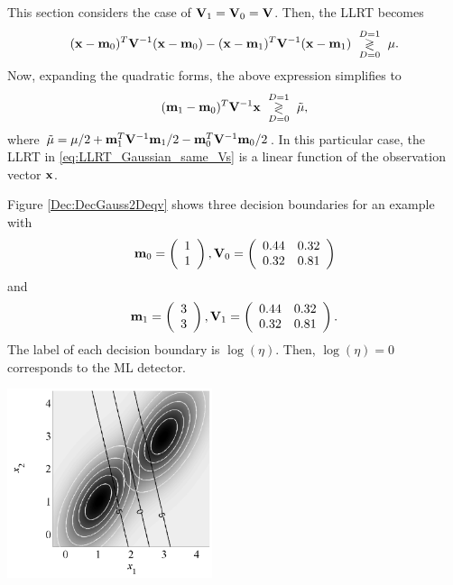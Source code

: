 This section considers the case of ${\bf V}_1 = {\bf V}_0 = {\bf V}$. Then, the LLRT becomes
\begin{equation*}
({\bf x}-{\bf m}_0)^T {\bf V}^{-1}({\bf x}-{\bf m}_0) 
- ({\bf x}-{\bf m}_1)^T {\bf V}^{-1}({\bf x}-{\bf m}_1)
\,\, \underset{D=0}{\overset{D=1}{\gtrless}}\,\, \mu.
\end{equation*}
Now, expanding the quadratic forms, the above expression simplifies to
\begin{equation}
 ({\bf m}_1-{\bf m}_0)^T {\bf V}^{-1}{\bf x} \,\, \underset{D=0}{\overset{D=1}{\gtrless}}\,\, \tilde{\mu},
 \label{eq:LLRT_Gaussian_same_Vs}
\end{equation}
where $\tilde{\mu} = \mu/2 + {\bf m}_1^T {\bf V}^{-1}{\bf m}_1/2 - {\bf m}_0^T {\bf V}^{-1}{\bf m}_0/2$. In this particular case, the LLRT in \eqref{eq:LLRT_Gaussian_same_Vs} is a linear function of the observation vector ${\bf x}$.

\begin{example}
	Figure \ref{Dec:DecGauss2Deqv} shows three decision boundaries for an example with
		\begin{equation*}
			{\bf m}_0 =  \left(\begin{array}{l}  1\\1  \end{array}\right), {\bf V}_0 = 
			\left(\begin{array}{ll} 0.44 & 0.32 \\ 0.32 & 0.81 \end{array} \right)
\end{equation*}
and
\begin{equation*}
{\bf m}_1 = \left(\begin{array}{l}  3\\3 \end{array}\right), {\bf V}_1 = 
\left(\begin{array}{ll} 0.44 & 0.32 \\ 0.32 & 0.81 \end{array} \right).
\end{equation*}
The label of each decision boundary is $\log(\eta)$. Then, $\log(\eta) = 0$ corresponds to the ML detector.
		\begin{center}
			\includegraphics[width=6cm]{Figures/DecGauss2Deqv.pdf}
			\label{Dec:DecGauss2Deqv}
		\end{center}
\end{example}

